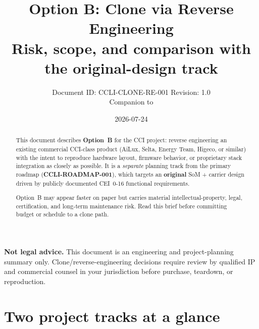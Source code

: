 \documentclass[11pt,a4paper]{article}
\title{%
  \textbf{Option B: Clone via Reverse Engineering}\\[0.4em]
  \large Risk, scope, and comparison with the original-design track
}
\author{Document ID: CCLI-CLONE-RE-001 \quad Revision: 1.0\\
Companion to \docref{CCLI-ROADMAP-001}}
\date{2026-07-24}
\newcommand{\docref}[1]{\textbf{#1}}
\begin{document}
\maketitle
\thispagestyle{empty}

\begin{abstract}
This document describes \textbf{Option~B} for the CCI project: reverse engineering an existing commercial CCI-class product
(AiLux, Selta, Energy Team, Higeco, or similar) with the intent to reproduce hardware layout, firmware behavior, or
proprietary stack integration as closely as possible. It is a \emph{separate} planning track from the primary roadmap
(\docref{CCLI-ROADMAP-001}), which targets an \textbf{original} SoM + carrier design driven by publicly documented CEI~0-16
functional requirements.

Option~B may appear faster on paper but carries material intellectual-property, legal, certification, and long-term
maintenance risk. Read this brief before committing budget or schedule to a clone path.
\end{abstract}

\begin{center}
\begin{minipage}{0.95\linewidth}
\colorbox{riskbg}{%
  \parbox{\dimexpr\linewidth-2\fboxsep\relax}{%
    \small
    \textbf{\textcolor{riskred}{Not legal advice.}}
    This document is an engineering and project-planning summary only.
    Clone/reverse-engineering decisions require review by qualified IP and commercial counsel in your jurisdiction
    before purchase, teardown, or reproduction.
  }%
}
\end{minipage}
\end{center}

\tableofcontents
\newpage

\section{Two project tracks at a glance}
\end{document}
